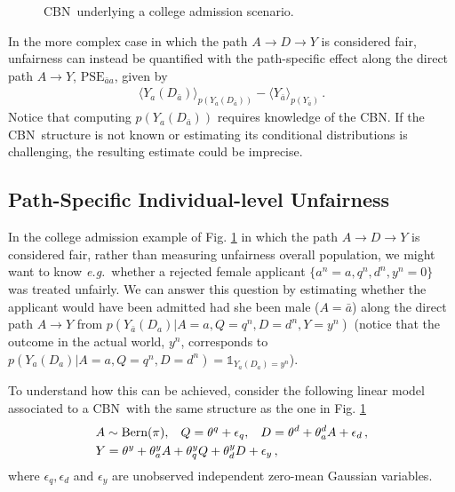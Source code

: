 \documentclass[runningheads]{llncs}
\newcommand{\figref}[1]{Fig. \ref{#1}}
\newcommand{\av}[1]{\langle #1 \rangle}
\newcommand{\eg}{\emph{e.g.}}
\newcommand{\CBN}{CBN}
\begin{document}
\begin{figure}
\vskip-0.4cm
\centering
{}
\vspace{-0.2cm}
\caption{\CBN~underlying a college admission scenario.}
\label{fig:CBNCA}
\end{figure}
\noindent In the more complex case in which the path $A \rightarrow D\rightarrow Y$ is considered fair, unfairness can instead be quantified with the path-specific effect along the direct path $A\rightarrow Y$, $\textrm{PSE}_{\bar a a}$, given by 
\begin{align*}
\av{Y_{a}(D_{\bar a})}_{p(Y_{a}(D_{\bar a}))}-\av{Y_{\bar a}}_{p(Y_{\bar a})}\,.
\end{align*}
Notice that computing $p(Y_{a}(D_{\bar a}))$ requires knowledge of the \CBN. 
If the \CBN~structure is not known or estimating its conditional distributions is challenging, the resulting estimate could be imprecise.

\subsection{Path-Specific Individual-level Unfairness}
In the college admission example of \figref{fig:CBNCA} in which the path $A \rightarrow D\rightarrow Y$ is considered fair, rather than measuring unfairness overall population, we might want to know \eg~whether a rejected female applicant $\{a^n=a, q^n, d^n, y^n=0\}$ was treated unfairly. We can answer this question by estimating whether the applicant would have been admitted had she been male ($A=\bar a$) along the direct path $A\rightarrow Y$ from $p(Y_{\bar a}(D_a)|A=a, Q=q^n, D=d^n, Y=y^n)$ (notice that the outcome in the actual world, $y^n$, corresponds to $p(Y_{a}(D_a)|A=a, Q=q^n, D=d^n)=\mathbb{1}_{Y_{a}(D_a)=y^n}$). 

To understand how this can be achieved, consider the following linear model associated to a \CBN~with the same structure as the one in \figref{fig:CBNCA}
\begin{align}
&A\sim\textrm{Bern}(\pi), \hskip0.3cm Q=\theta^q+\epsilon_q, \hskip0.3cm D=\theta^d+\theta^d_{a}A+\epsilon_d\,,\nonumber\\ 
&\hskip0.0cm Y=\theta^y+\theta^y_{a}A+\theta^y_{q}Q+\theta^y_{d}D+\epsilon_y\,,
\label{eq:model}
\end{align}
where $\epsilon_q,\epsilon_d$ and $\epsilon_y$ are unobserved independent zero-mean Gaussian variables.
\end{document}
